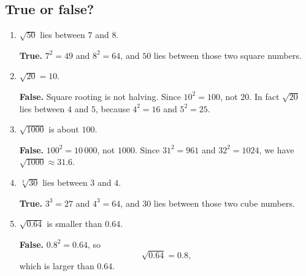 \documentclass[11pt]{article}
\begin{document}
\subsection*{True or false?}
\begin{enumerate}
\item $\sqrt{50}$ lies between $7$ and $8$.

\textbf{True.} $7^2=49$ and $8^2=64$, and $50$ lies between those two square numbers.

\item $\sqrt{20}=10$.

\textbf{False.} Square rooting is not halving. Since $10^2=100$, not $20$. In fact $\sqrt{20}$ lies between $4$ and $5$, because $4^2=16$ and $5^2=25$.

\item $\sqrt{1000}$ is about $100$.

\textbf{False.} $100^2=10\,000$, not $1000$. Since $31^2=961$ and $32^2=1024$, we have $\sqrt{1000}\approx31.6$.

\item $\sqrt[3]{30}$ lies between $3$ and $4$.

\textbf{True.} $3^3=27$ and $4^3=64$, and $30$ lies between those two cube numbers.

\item $\sqrt{0.64}$ is smaller than $0.64$.

\textbf{False.} $0.8^2=0.64$, so
\[
\sqrt{0.64}=0.8,
\]
which is larger than $0.64$.
\end{enumerate}
\end{document}
